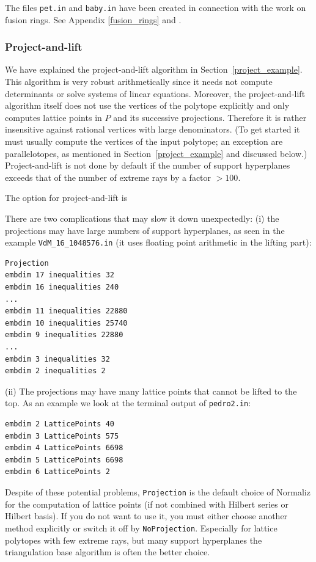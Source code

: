 The files \verb|pet.in| and \verb|baby.in| have been created in connection with the work on fusion rings. See Appendix \ref{fusion_rings} and \cite{ABPP}.

\subsubsection{Project-and-lift}\label{project}

We have explained the project-and-lift algorithm in Section~\ref{project_example}.
This algorithm is very robust arithmetically since it needs not compute determinants or solve systems of linear equations. Moreover, the project-and-lift algorithm itself does not use the vertices of the polytope explicitly and only computes lattice points in $P$ and its successive projections. Therefore it is rather insensitive against rational vertices with large denominators. (To get started it must usually compute the vertices of the input polytope; an exception are parallelotopes, as mentioned in Section~\ref{project_example} and discussed below.) Project-and-lift is not done by default if the number of support hyperplanes exceeds that of the number of extreme rays by a factor $>100$.

The option for project-and-lift is
\begin{itemize}
	\itemtt [Projection, -j]
\end{itemize}

There are two complications that may slow it down unexpectedly: (i) the projections may have large numbers of support hyperplanes, as seen in the example \verb|VdM_16_1048576.in| (it uses floating point arithmetic in the lifting part):
\begin{Verbatim}
Projection
embdim 17 inequalities 32
embdim 16 inequalities 240
...
embdim 11 inequalities 22880
embdim 10 inequalities 25740
embdim 9 inequalities 22880
...
embdim 3 inequalities 32
embdim 2 inequalities 2
\end{Verbatim}

(ii) The projections may have many lattice points that cannot be lifted to the top. As an example we look at the terminal output of \verb|pedro2.in|:
\begin{Verbatim}
embdim 2 LatticePoints 40
embdim 3 LatticePoints 575
embdim 4 LatticePoints 6698
embdim 5 LatticePoints 6698
embdim 6 LatticePoints 2
\end{Verbatim}

Despite of these potential problems, \verb|Projection| is the default choice of Normaliz for the computation of lattice points (if not combined with Hilbert series or Hilbert basis). If you do not want to use it, you must either choose another method explicitly or switch it off by \verb|NoProjection|. Especially for lattice polytopes with few extreme rays, but many support hyperplanes the triangulation base algorithm is often the better choice.

